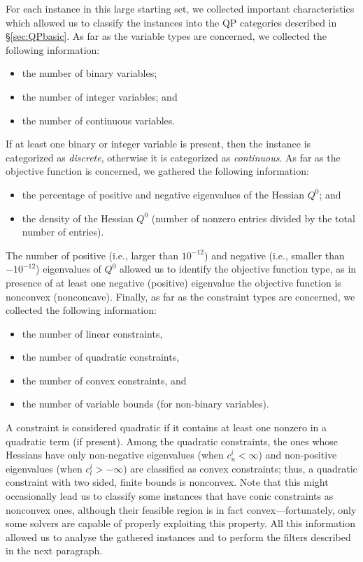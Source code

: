 For each instance in this large starting set,
we collected important characteristics
which allowed us to classify the instances into the QP categories described in
\S\ref{sec:QPbasic}. As far as the variable types are concerned, we
collected the following information:
%
\begin{itemize}
 \item the number of binary variables; %
 \item the number of integer variables; and %
 \item the number of continuous variables. %
\end{itemize}
%
If at least one binary or integer variable is present, then the instance is
categorized as \emph{discrete}, otherwise it is categorized as \emph{continuous}.
As far as the objective function is concerned, we gathered the following
information:
%
\begin{itemize}
 \item the percentage of positive and negative eigenvalues of the Hessian
      $Q^0$; and
 \item the density of the Hessian $Q^0$ (number of nonzero entries divided by the total
       number of entries). %
\end{itemize}
%

The number of positive (i.e., larger than $10^{-12}$) and negative (i.e., smaller than $-10^{-12}$) eigenvalues of $Q^0$ allowed us to identify the
objective function type, as in presence of at least one negative (positive) eigenvalue
the objective function is nonconvex (nonconcave). Finally, as far as the constraint types
are concerned, we collected the following information:
%
\begin{itemize}
 \item the number of linear constraints, %
 \item the number of quadratic constraints, %
 \item the number of convex constraints, and %
 \item the number of variable bounds (for non-binary variables). %
\end{itemize}
%
A constraint is considered quadratic if it contains at least one nonzero in
a quadratic term (if present). Among the quadratic constraints, the ones whose
Hessians have only non-negative eigenvalues (when $c_u^i < \infty$) and
non-positive eigenvalues (when $c_l^i > - \infty$)
are classified as convex constraints; thus, a quadratic constraint with
two sided, finite bounds is nonconvex.
Note that this might occasionally lead us to classify some instances that have conic constraints as nonconvex ones, although their feasible region is in fact convex---fortunately, only some solvers are capable of properly exploiting this property.
 All this information allowed us to analyse the gathered instances and to perform the
filters described in the next paragraph.

